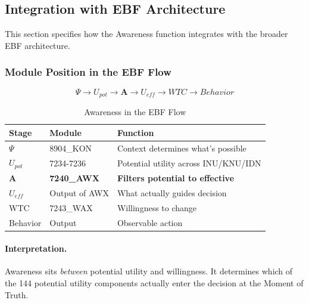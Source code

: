 \subsection{Integration with EBF Architecture}
\label{subsec:11-11-integration}


This section specifies how the Awareness function integrates with the
broader EBF architecture.

\subsubsection{Module Position in the EBF Flow}

\begin{equation}
\boxed{\Psi \rightarrow U_{pot} \rightarrow \mathbf{A} \rightarrow U_{eff} \rightarrow WTC \rightarrow Behavior}
\end{equation}

\begin{table}[htbp]
\centering
\caption{Awareness in the EBF Flow}
\label{tab:bcm-flow}
\renewcommand{\arraystretch}{1.3}
\begin{tabular}{@{}lll@{}}
\toprule
\textbf{Stage} & \textbf{Module} & \textbf{Function} \\
\midrule
$\Psi$ & 8904\_KON & Context determines what's possible \\
$U_{pot}$ & 7234-7236 & Potential utility across INU/KNU/IDN \\
$\mathbf{A}$ & \textbf{7240\_AWX} & \textbf{Filters potential to effective} \\
$U_{eff}$ & Output of AWX & What actually guides decision \\
WTC & 7243\_WAX & Willingness to change \\
Behavior & Output & Observable action \\
\bottomrule
\end{tabular}
\end{table}

\paragraph{Interpretation.}
Awareness sits \emph{between} potential utility and willingness. It determines
which of the 144 potential utility components actually enter the decision
at the Moment of Truth.

